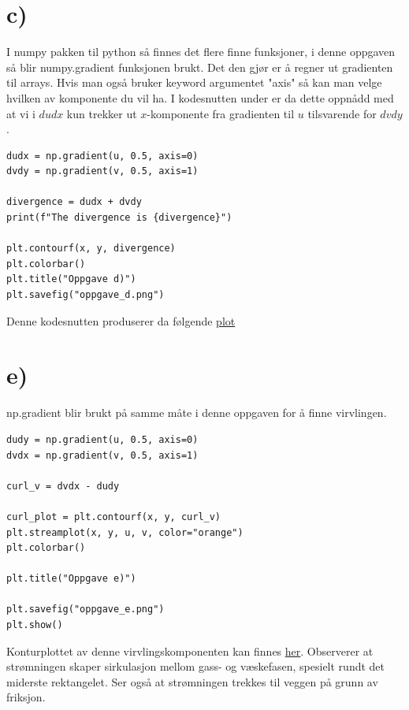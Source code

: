 \documentclass[a4paper,10pt,norsk]{article}
\begin{document}
	\section*{c)}\label{ass:d}
	I numpy pakken til python så finnes det flere finne funksjoner, i denne oppgaven så blir numpy.gradient funksjonen brukt. Det den gjør er å regner ut gradienten til arrays. Hvis man også bruker keyword argumentet "axis" så kan man velge hvilken av komponente du vil ha. I kodesnutten under er da dette oppnådd med at vi i $dudx$ kun trekker ut $x$-komponente fra gradienten til $u$ tilsvarende for  $dvdy$.
	\begin{lstlisting}[caption=Oppgave d]
dudx = np.gradient(u, 0.5, axis=0)
dvdy = np.gradient(v, 0.5, axis=1)

divergence = dudx + dvdy
print(f"The divergence is {divergence}")

plt.contourf(x, y, divergence)
plt.colorbar()
plt.title("Oppgave d)")
plt.savefig("oppgave_d.png")
	\end{lstlisting}
	Denne kodesnutten produserer da følgende \hyperref[fig:d]{plot}
	\section*{e)}\label{ass:e}
	np.gradient blir brukt på samme måte i denne oppgaven for å finne virvlingen.
	\begin{lstlisting}
dudy = np.gradient(u, 0.5, axis=0)
dvdx = np.gradient(v, 0.5, axis=1)

curl_v = dvdx - dudy

curl_plot = plt.contourf(x, y, curl_v)
plt.streamplot(x, y, u, v, color="orange")
plt.colorbar()

plt.title("Oppgave e)")

plt.savefig("oppgave_e.png")
plt.show()
	\end{lstlisting}
	Konturplottet av denne virvlingskomponenten kan finnes \hyperref[fig:e]{her}. Observerer at strømningen skaper sirkulasjon mellom gass- og væskefasen, spesielt rundt det miderste rektangelet. Ser også at strømningen trekkes til veggen på grunn av friksjon. 
\end{document}
